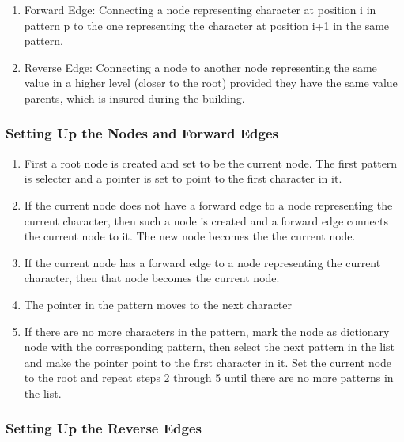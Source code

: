 \documentclass[paper=a4, fontsize=11pt]{scrartcl} %
\numberwithin{equation}{section} %
\numberwithin{figure}{section} %
\numberwithin{table}{section} %
\begin{document}
\begin{enumerate}
\item Forward Edge: Connecting a node representing character at position i in pattern p to the one representing the character at position i+1 in the same pattern.
\item Reverse Edge: Connecting a node to another node representing the same value in a higher level (closer to the root) provided they have the same value parents, which is insured during the building.
\end{enumerate}

\subsubsection{Setting Up the Nodes and Forward Edges}
\begin{enumerate}

\item First a root node is created and set to be the current node. The first pattern is selecter and a pointer is set to point to the first character in it.

\item If the current node does not have a forward edge to a node representing the current character, then such a node is created and a forward edge connects the current node to it. The new node becomes the the current node.

\item If the current node has a forward edge to a node representing the current character, then that node becomes the current node.

\item The pointer in the pattern moves to the next character

\item If there are no more characters in the pattern, mark the node as dictionary node with the corresponding pattern, then select the next pattern in the list and make the pointer point to the first character in it. Set the current node to the root and repeat steps 2 through 5 until there are no more patterns in the list.
\end{enumerate}




\subsubsection{Setting Up the Reverse Edges}
\end{document}
